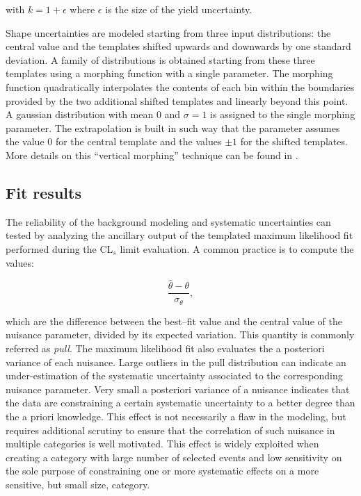 with $k = 1+ \epsilon$ where $\epsilon$ is the size of the yield uncertainty.

Shape uncertainties are modeled starting from three input distributions: the central value and the templates shifted upwards and downwards by one standard deviation. A family of distributions is obtained starting from these three templates using a morphing function with a single parameter. The morphing function quadratically interpolates the contents of each bin within the boundaries provided by the two additional shifted templates and linearly beyond this point. A gaussian distribution with mean 0 and $\sigma = 1$ is assigned to the single morphing parameter. The extrapolation is built in such way that the parameter assumes the value 0 for the central template and the values $\pm1$ for the shifted templates. More details on this ``vertical morphing'' technique can be found in \cite{Conway:2011in}.

\subsection{Fit results}

The reliability of the background modeling and systematic uncertainties can tested by analyzing the ancillary output of the templated maximum likelihood fit performed during the CL$_s$ limit evaluation. A common practice is to compute the values:

\begin{equation}
\dfrac{\hat{\theta} - \theta}{\sigma_{\theta}},
\end{equation}

which are the difference between the best--fit value and the central value of the nuisance parameter, divided by its expected variation. This quantity is commonly referred as \emph{pull}. The maximum likelihood fit also evaluates the a posteriori variance of each nuisance. Large outliers in the pull distribution can indicate an under-estimation of the systematic uncertainty associated to the corresponding nuisance parameter. Very small a posteriori variance of a nuisance indicates that the data are constraining a certain systematic uncertainty to a better degree than the a priori knowledge. This effect is not necessarily a flaw in the modeling, but requires additional scrutiny to ensure that the correlation of such nuisance in multiple categories is well motivated. This effect is widely exploited when creating a category with large number of selected events and low sensitivity on the sole purpose of constraining one or more systematic effects on a more sensitive, but small size, category. 


